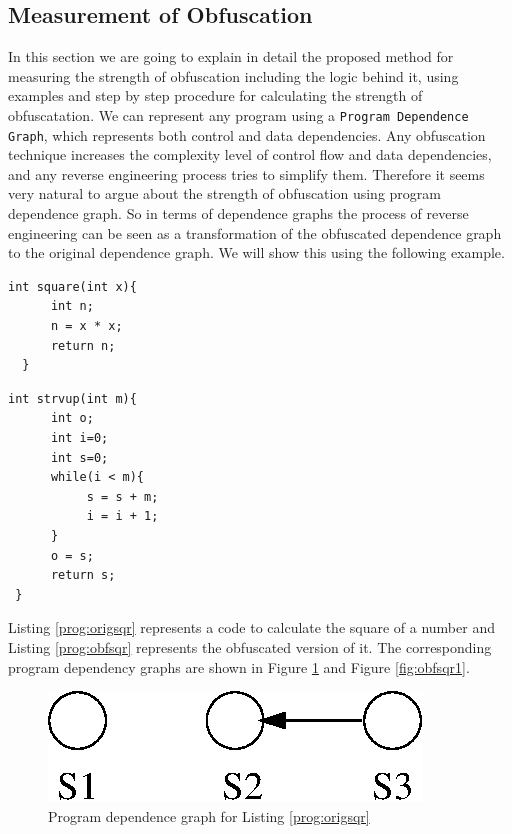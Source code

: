 \documentclass[conference]{IEEEtran}
\begin{document}
\subsection{Measurement of Obfuscation}
In this section we are going to explain in detail the proposed method for measuring the strength of obfuscation including the logic behind it, using examples and step by step procedure 
for calculating the strength of obfuscatation. We can represent any program using a {\tt Program Dependence Graph}, which represents both control and data dependencies. Any obfuscation 
technique increases the complexity level of control flow and data dependencies, and any reverse engineering process tries to simplify them. Therefore it seems very natural to argue about 
the strength of obfuscation using program dependence graph. So in terms of dependence graphs the process of reverse engineering can be seen as a transformation of the obfuscated dependence 
graph to the original dependence graph. We will show this using the following example.
\tiny\begin{lstlisting}[frame=single]
 int square(int x){
	  int n;
	  n = x * x;
	  return n;
  }
\end{lstlisting}
\normalsize
{}
\tiny\begin{lstlisting}[frame=single]
 int strvup(int m){
	  int o;
	  int i=0;
	  int s=0;
	  while(i < m){
		   s = s + m;
		   i = i + 1;
	  }
	  o = s;
	  return s;
 }
\end{lstlisting}
\normalsize
Listing \ref{prog:origsqr} represents a code to calculate the square of a number and Listing \ref{prog:obfsqr} represents the obfuscated version of it. The corresponding program dependency 
graphs are shown in Figure \ref{fig:origsqr} and Figure \ref{fig:obfsqr1}.
\begin{figure}[h]
 \centering
 \includegraphics[scale=0.3]{./origdep.eps}
 \caption{Program dependence graph for Listing \ref{prog:origsqr}}
 \label{fig:origsqr}
\end{figure}
\end{document}

